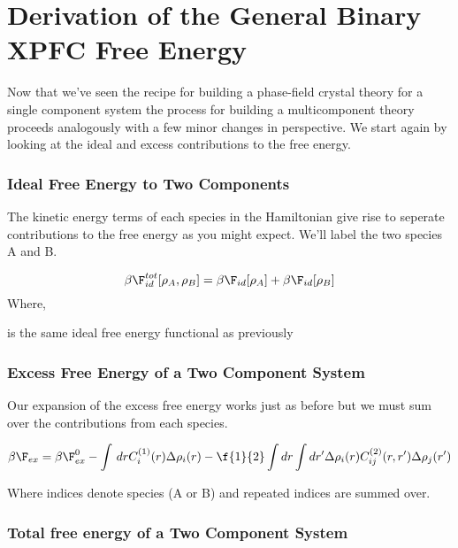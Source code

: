 \section{Derivation of the General Binary XPFC Free Energy}

Now that we've seen the recipe for building a phase-field crystal theory for a single component system the process for building a multicomponent theory proceeds analogously with a few minor changes in perspective.
We start again by looking at the ideal and excess contributions to the free energy.

\subsubsection{Ideal Free Energy to Two Components}
The kinetic energy terms of each species in the Hamiltonian give rise to seperate contributions to the free energy as you might expect.
We'll label the two species A and B.

\begin{equation}
    \beta\F^{tot}_{id}[\rho_A, \rho_B] = \beta\F_{id}[\rho_A] + \beta\F_{id}[\rho_B]
\end{equation}
Where,
\begin{description}[labelindent=10pt, labelsep=10pt]
    \item[$\beta\F_{id}$] is the same ideal free energy functional as previously
\end{description}

\subsubsection{Excess Free Energy of a Two Component System}
Our expansion of the excess free energy works just as before but we must sum over the contributions from each species.

\begin{equation}
    \beta\F_{ex} = \beta\F_{ex}^0 - \int \,dr C^{(1)}_{i}(r) \Delta\rho_i(r)
    - \f{1}{2} \int dr \int dr^\prime \Delta\rho_i(r) C^{(2)}_{ij}(r, r^\prime) \Delta\rho_j(r^\prime)
\end{equation}

Where indices denote species (A or B) and repeated indices are summed over.

\subsubsection{Total free energy of a Two Component System}

